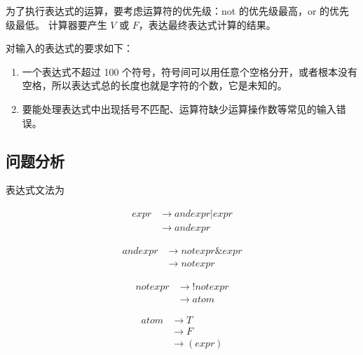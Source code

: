 \documentclass[UTF8]{ctexart}
\begin{document}
      为了执行表达式的运算，要考虑运算符的优先级：not 的优先级最高，or 的优先级最低。
      计算器要产生 $V$ 或 $F$，表达最终表达式计算的结果。

      对输入的表达式的要求如下：
      \begin{enumerate}
        \item 一个表达式不超过 100 个符号，符号间可以用任意个空格分开，或者根本没有空格，所以表达式总的长度也就是字符的个数，它是未知的。
        \item 要能处理表达式中出现括号不匹配、运算符缺少运算操作数等常见的输入错误。
      \end{enumerate}
    \subsection{问题分析}
      表达式文法为

      \begin{equation}
      \begin{aligned}
        expr & \rightarrow andexpr | expr \\
             & \rightarrow andexpr
      \end{aligned}
      \end{equation}

      \begin{equation}
      \begin{aligned}
        andexpr & \rightarrow notexpr \& expr \\
                & \rightarrow notexpr
      \end{aligned}
      \end{equation}

      \begin{equation}
      \begin{aligned}
        notexpr & \rightarrow ! notexpr \\
                & \rightarrow atom
      \end{aligned}
      \end{equation}

      \begin{equation}
      \begin{aligned}
        atom & \rightarrow T \\
             & \rightarrow F \\
             & \rightarrow (expr) \\
      \end{aligned}
      \end{equation}
\end{document}
